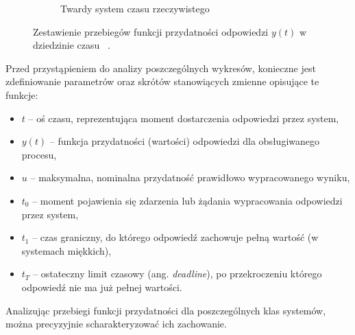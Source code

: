 \begin{figure}[htbp]
\vspace{6ex} %

\begin{subfigure}[b]{\textwidth}
\centering
{}
\caption{Twardy system czasu rzeczywistego}
\label{fig:Hard RTOS wykres}
\end{subfigure}

\caption{Zestawienie przebiegów funkcji przydatności odpowiedzi $y(t)$ w dziedzinie czasu ~\cite{Tanenbaum}.}
\label{fig:wykresy RTOS}
\end{figure}

Przed przystąpieniem do analizy poszczególnych wykresów, konieczne jest zdefiniowanie parametrów oraz skrótów stanowiących zmienne opisujące te funkcje:
\begin{itemize}
    \item $t$ -- oś czasu, reprezentująca moment dostarczenia odpowiedzi przez system,
    \item $y(t)$ -- funkcja przydatności (wartości) odpowiedzi dla obsługiwanego procesu,
    \item $u$ -- maksymalna, nominalna przydatność prawidłowo wypracowanego wyniku,
    \item $t_0$ -- moment pojawienia się zdarzenia lub żądania wypracowania odpowiedzi przez system,
    \item $t_1$ -- czas graniczny, do którego odpowiedź zachowuje pełną wartość (w systemach miękkich),
    \item $t_T$ -- ostateczny limit czasowy (ang. \textit{deadline}), po przekroczeniu którego odpowiedź nie ma już pełnej wartości.
\end{itemize}
Analizując przebiegi funkcji przydatności dla poszczególnych klas systemów, można precyzyjnie scharakteryzować ich zachowanie.

